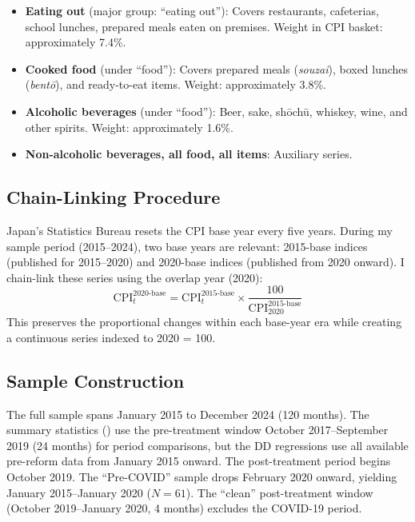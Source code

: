 \documentclass[12pt]{article}
\begin{document}
\begin{itemize}
\item \textbf{Eating out} (major group: ``eating out''): Covers restaurants, cafeterias, school lunches, prepared meals eaten on premises. Weight in CPI basket: approximately 7.4\%.
\item \textbf{Cooked food} (under ``food''): Covers prepared meals (\textit{souzai}), boxed lunches (\textit{bent\={o}}), and ready-to-eat items. Weight: approximately 3.8\%.
\item \textbf{Alcoholic beverages} (under ``food''): Beer, sake, sh\={o}ch\={u}, whiskey, wine, and other spirits. Weight: approximately 1.6\%.
\item \textbf{Non-alcoholic beverages, all food, all items}: Auxiliary series.
\end{itemize}

\subsection{Chain-Linking Procedure}

Japan's Statistics Bureau resets the CPI base year every five years. During my sample period (2015--2024), two base years are relevant: 2015-base indices (published for 2015--2020) and 2020-base indices (published from 2020 onward). I chain-link these series using the overlap year (2020):
\begin{equation}
\text{CPI}_{t}^{\text{2020-base}} = \text{CPI}_{t}^{\text{2015-base}} \times \frac{100}{\text{CPI}_{2020}^{\text{2015-base}}}
\end{equation}
This preserves the proportional changes within each base-year era while creating a continuous series indexed to 2020 = 100.

\subsection{Sample Construction}

The full sample spans January 2015 to December 2024 (120 months). The summary statistics () use the pre-treatment window October 2017--September 2019 (24 months) for period comparisons, but the DD regressions use all available pre-reform data from January 2015 onward. The post-treatment period begins October 2019. The ``Pre-COVID'' sample drops February 2020 onward, yielding January 2015--January 2020 ($N = 61$). The ``clean'' post-treatment window (October 2019--January 2020, 4 months) excludes the COVID-19 period.
\end{document}
